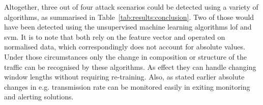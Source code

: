 \begin{comment}
\begin{itemize}
	\item 3 out of 4 attacks were successfully detected
	\item 2 of those by machine learning algorithms
	\item to note, that lof and svm were trained with normalised data
		\subitem traffic rates not into account
		\subitem only change in composition/structure can be recognised
		\subitem changes in transmission rate should be monitored in Grafana
		
	\item \gls{svm} is the best performing algo
		\subitem low background noise
		\subitem detected both direct attacks
		\subitem sharp decision surface
		\subitem small model, quick detection/estimation
		\subitem model training is computational intensive
				
	\item \gls{lof} does not perform well
		\subitem requires at least further tuning
		\subitem high background noise (cf. Figure~\ref{fig:results:validation:outlier})
		\subitem detected only \gls{dos} reliably
		\subitem almost detected scan, but was not clear distinguishable from background noise
		\subitem large model, longer computation time for detection
		\subitem nearest neighbour search is perform every time -> computational heavy, especially for large datasets
		
	\item addr analyser
		\subitem simple method to any drastic change involving unknown addresses in the network
		\subitem good supplement
		\subitem low resource overhead: small model, quick detection, fast training
	
	\item entropy was useless
		\subitem mostly entropy of inf calculated
\end{itemize}
\end{comment}

Altogether, three out of four attack scenarios could be detected using a variety of algorithms, as summarised in Table~\ref{tab:results:conclusion}. Two of those would have been detected using the unsupervised machine learning algorithms \gls{lof} and \gls{svm}.
It is to note that both rely on the feature vector and operated on normalised data, which correspondingly does not account for absolute values.
Under those circumstances only the change in composition or structure of the traffic can be recognised by these algorithms. As effect they can handle changing window lengths without requiring re-training.
Also, as stated earlier absolute changes in e.g. transmission rate can be monitored easily in exiting monitoring and alerting solutions.


